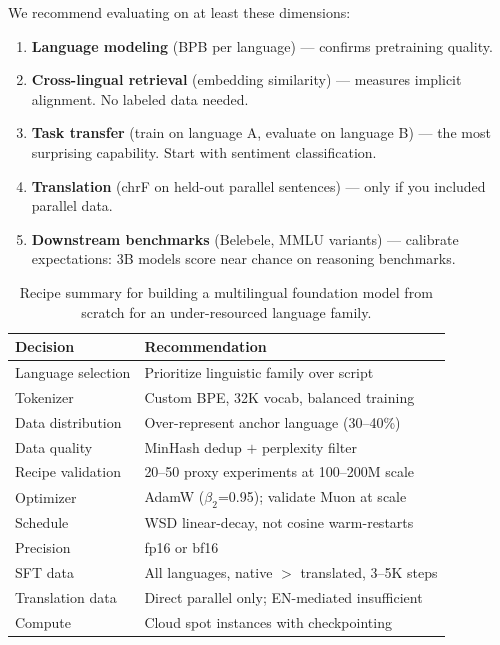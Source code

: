 \documentclass[10pt,twocolumn]{article}
\begin{document}
We recommend evaluating on at least these dimensions:
\begin{enumerate}
    \item \textbf{Language modeling} (BPB per language) --- confirms pretraining quality.
    \item \textbf{Cross-lingual retrieval} (embedding similarity) --- measures implicit alignment. No labeled data needed.
    \item \textbf{Task transfer} (train on language A, evaluate on language B) --- the most surprising capability. Start with sentiment classification.
    \item \textbf{Translation} (chrF on held-out parallel sentences) --- only if you included parallel data.
    \item \textbf{Downstream benchmarks} (Belebele, MMLU variants) --- calibrate expectations: 3B models score near chance on reasoning benchmarks.
\end{enumerate}

\begin{table}[H]
\centering\scriptsize
\begin{tabular}{lp{4cm}}
\toprule
\textbf{Decision} & \textbf{Recommendation} \\
\midrule
Language selection & Prioritize linguistic family over script \\
Tokenizer & Custom BPE, 32K vocab, balanced training \\
Data distribution & Over-represent anchor language (30--40\%) \\
Data quality & MinHash dedup $+$ perplexity filter \\
Recipe validation & 20--50 proxy experiments at 100--200M scale \\
Optimizer & AdamW ($\beta_2$=0.95); validate Muon at scale \\
Schedule & WSD linear-decay, not cosine warm-restarts \\
Precision & fp16 or bf16 \\
SFT data & All languages, native $>$ translated, 3--5K steps \\
Translation data & Direct parallel only; EN-mediated insufficient \\
Compute & Cloud spot instances with checkpointing \\
\bottomrule
\end{tabular}
\caption{Recipe summary for building a multilingual foundation model from scratch for an under-resourced language family.}
\label{tab:recipe}
\end{table}
\end{document}
